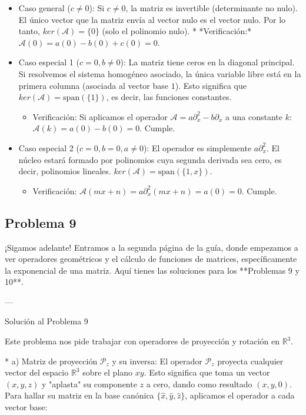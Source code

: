 \documentclass[11pt,spanish]{article}
\newcounter{problema}
\begin{document}
\begin{enumerate}
\begin{itemize}
\item Caso general ($c \neq 0$): Si $c \neq 0$, la matriz es invertible (determinante no nulo). El único vector que la matriz envía al vector nulo es el vector nulo. Por lo tanto, $ker(\mathcal{A}) = \{0\}$ (solo el polinomio nulo).
* *Verificación:* $\mathcal{A}(0) = a(0) - b(0) + c(0) = 0$.


\item Caso especial 1 ($c = 0, b \neq 0$): La matriz tiene ceros en la diagonal principal. Si resolvemos el sistema homogéneo asociado, la única variable libre está en la primera columna (asociada al vector base $1$). Esto significa que $ker(\mathcal{A}) = \text{span}(\{1\})$, es decir, las funciones constantes.
\begin{itemize}
\item Verificación: Si aplicamos el operador $\mathcal{A} = a\partial_{x}^{2} - b\partial_{x}$ a una constante $k$: $\mathcal{A}(k) = a(0) - b(0) = 0$. Cumple.
\end{itemize}

\item Caso especial 2 ($c = 0, b = 0, a \neq 0$): El operador es simplemente $a\partial_{x}^{2}$. El núcleo estará formado por polinomios cuya segunda derivada sea cero, es decir, polinomios lineales. $ker(\mathcal{A}) = \text{span}(\{1, x\})$.
\begin{itemize}
\item Verificación: $\mathcal{A}(mx + n) = a\partial_{x}^{2}(mx + n) = a(0) = 0$. Cumple.
\end{itemize}
\end{itemize}
\end{enumerate}

\subsection*{Problema 9}

¡Sigamos adelante! Entramos a la segunda página de la guía, donde empezamos a ver operadores geométricos y el cálculo de funciones de matrices, específicamente la exponencial de una matriz. Aquí tienes las soluciones para los **Problemas 9 y 10**.

---

Solución al Problema 9 

Este problema nos pide trabajar con operadores de proyección y rotación en $\mathbb{R}^{3}$.

* 
a) Matriz de proyección $\mathcal{P}_{z}$ y su inversa:
El operador $\mathcal{P}_{z}$ proyecta cualquier vector del espacio $\mathbb{R}^{3}$ sobre el plano $xy$. Esto significa que toma un vector $(x, y, z)$ y "aplasta" su componente $z$ a cero, dando como resultado $(x, y, 0)$.
Para hallar su matriz en la base canónica $\{\hat{x}, \hat{y}, \hat{z}\}$, aplicamos el operador a cada vector base:
\end{document}
